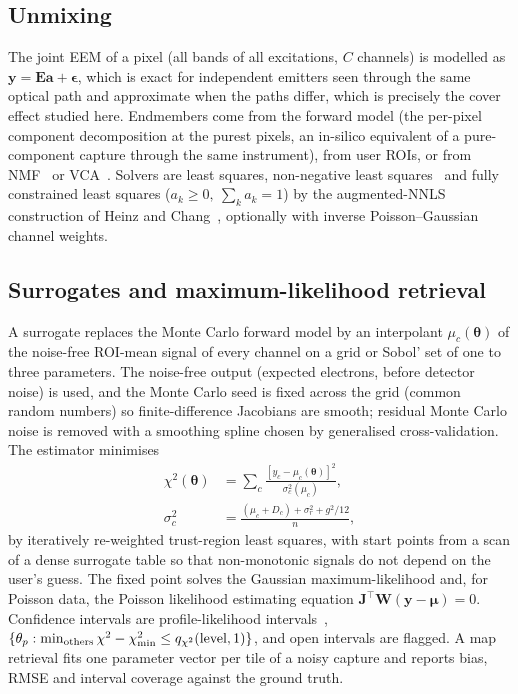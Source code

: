 \documentclass[journal]{IEEEtran}
\begin{document}
\subsection{Unmixing}
The joint EEM of a pixel (all bands of all excitations, $C$ channels) is modelled as $\mathbf y=\mathbf E\mathbf a+\boldsymbol\epsilon$, which is exact for independent emitters seen through the same optical path and approximate when the paths differ, which is precisely the cover effect studied here. Endmembers come from the forward model (the per-pixel component decomposition at the purest pixels, an in-silico equivalent of a pure-component capture through the same instrument), from user ROIs, or from NMF~\cite{lee1999} or VCA~\cite{nascimento2005}. Solvers are least squares, non-negative least squares~\cite{lawson1995} and fully constrained least squares ($a_k\ge0,\ \sum_ka_k=1$) by the augmented-NNLS construction of Heinz and Chang~\cite{heinz2001}, optionally with inverse Poisson--Gaussian channel weights.

\subsection{Surrogates and maximum-likelihood retrieval}
A surrogate replaces the Monte Carlo forward model by an interpolant $\mu_c(\boldsymbol\theta)$ of the noise-free ROI-mean signal of every channel on a grid or Sobol' set of one to three parameters. The noise-free output (expected electrons, before detector noise) is used, and the Monte Carlo seed is fixed across the grid (common random numbers) so finite-difference Jacobians are smooth; residual Monte Carlo noise is removed with a smoothing spline chosen by generalised cross-validation. The estimator minimises
\begin{equation}
\begin{split}\chi^2(\boldsymbol\theta)&=\sum_c\frac{[y_c-\mu_c(\boldsymbol\theta)]^2}{\sigma_c^2(\mu_c)},\\ \sigma_c^2&=\frac{(\mu_c+D_c)+\sigma_r^2+g^2/12}{n},\end{split}
\label{eq:chi2}
\end{equation}
by iteratively re-weighted trust-region least squares, with start points from a scan of a dense surrogate table so that non-monotonic signals do not depend on the user's guess. The fixed point solves the Gaussian maximum-likelihood and, for Poisson data, the Poisson likelihood estimating equation $\mathbf J^\top\mathbf W(\mathbf y-\boldsymbol\mu)=0$. Confidence intervals are profile-likelihood intervals~\cite{venzon1988}, $\{\theta_p:\min_{\rm others}\chi^2-\chi^2_{\min}\le q_{\chi^2}(\text{level},1)\}$, and open intervals are flagged. A map retrieval fits one parameter vector per tile of a noisy capture and reports bias, RMSE and interval coverage against the ground truth.
\end{document}
